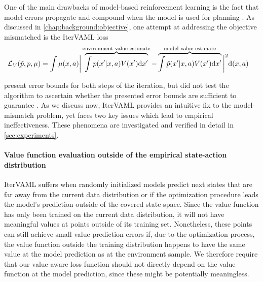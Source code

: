 One of the main drawbacks of model-based reinforcement learning is the fact that model errors propagate and compound when the model is used for planning \parencite{schneider1997exploiting,kearns2002near,talvitie2017self}.
As discussed in \autoref{chap:background:objective}, one attempt at addressing the objective mismatched is the IterVAML loss \parencite{itervaml}
\begin{align}
    &\mathcal{L}_V(\hat{p}, p, \mu) = \int \mu(x,a) \bigg|\overbrace{\int p(x'|x,a)V(x')\mathrm{d}x'}^{\text{environment value estimate}}  - \overbrace{\int \hat{p}(x'|x,a) V(x') \mathrm{d}x'}^{\text{model value estimate}}\bigg|^2 \mathrm{d} (x,a)
\end{align}

\textcite{itervaml} present error bounds for both steps of the iteration, but did not test the algorithm to ascertain whether the presented error bounds are sufficient to guarantee . 
As we discuss now, IterVAML provides an intuitive fix to the model-mismatch problem, yet faces two key issues which lead to empirical ineffectiveness.  
These phenomena are investigated and verified in detail in \autoref{sec:experiments}.


\paragraph{Value function evaluation outside of the empirical state-action distribution} IterVAML suffers when randomly initialized models predict next states that are far away from the current data distribution or if the optimization procedure leads the model's prediction outside of the covered state space. 
Since the value function has only been trained on the current data distribution, it will not have meaningful values at points outside of its training set.
Nonetheless, these points can still achieve small value prediction errors if, due to the optimization process, the value function outside the training distribution happens to have the same value at the model prediction as at the environment sample.
We therefore require that our value-aware loss function should not directly depend on the value function at the model prediction, since these might be potentially meaningless.


